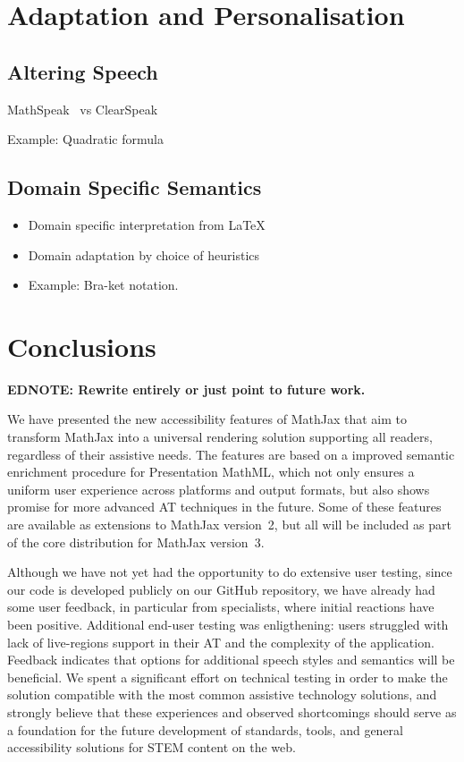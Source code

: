 \documentclass{sig-alternate}
\newcommand\edbf[1]{\typeout{There is still an editor's note!!!}%
  \textbf{EDNOTE: #1}}
\begin{document}
\section{Adaptation and Personalisation}
\label{sec:challenges}

\subsection{Altering Speech}

MathSpeak~\cite{MathSpeak} vs ClearSpeak~\cite{frankel2016development}

Example: Quadratic formula

\subsection{Domain Specific Semantics}

\begin{itemize}
\item Domain specific interpretation from {\LaTeX}
\item Domain adaptation by choice of heuristics
\item Example: Bra-ket notation.
\end{itemize}



\section{Conclusions}
\label{sec:conc}

\edbf{Rewrite entirely or just point to future work.}

We have presented the new accessibility features of MathJax that aim to
transform MathJax into a universal rendering solution supporting all readers,
regardless of their assistive needs. The features are based on a improved semantic
enrichment procedure for Presentation MathML, which not only ensures a uniform
user experience across platforms and output formats, but also shows promise
for more advanced AT techniques in the future. Some of these features are available
as extensions to MathJax version~2, but all will be included as part of the core
distribution for MathJax version~3.

Although we have not yet had the opportunity to do extensive user testing, since
our code is developed publicly on our GitHub repository, we have already had
some user feedback, in particular from specialists, where initial reactions have
been positive. Additional end-user testing was enligthening: users struggled 
with lack of live-regions support in their AT and the complexity of the 
application. Feedback indicates that options for additional speech styles and 
semantics will be beneficial. 
We spent a significant effort on
technical testing in order to make the solution compatible with the most common
assistive technology solutions, and
strongly believe that these experiences and
observed shortcomings should serve as a foundation for the future development
of standards, tools, and general accessibility solutions for STEM content on the
web. 
\end{document}
